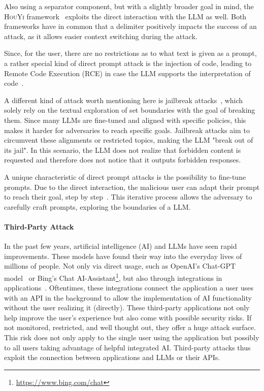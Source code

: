 Also using a separator component, but with a slightly broader goal in mind, the \textsc{HouYi} framework~\cite{liu2023prompt} exploits the direct interaction with the LLM as well.
Both frameworks have in common that a delimiter positively impacts the success of an attack, as it allows easier context switching during the attack. 

Since, for the user, there are no restrictions as to what text is given as a prompt, a rather special kind of direct prompt attack is the injection of code, leading to Remote Code Execution (RCE) in case the LLM supports the interpretation of code~\cite{yu2023assessing, liu2023demystifying}. 

A different kind of attack worth mentioning here is jailbreak attacks~\cite{wei2023jailbroken}, which solely rely on the textual exploration of set boundaries with the goal of breaking them. Since many LLMs are fine-tuned and aligned with specific policies, this makes it harder for adversaries to reach specific goals. Jailbreak attacks aim to circumvent these alignments or restricted topics, making the LLM "break out of its jail". In this scenario, the LLM does not realize that forbidden content is requested and therefore does not notice that it outputs forbidden responses.

A unique characteristic of direct prompt attacks is the possibility to fine-tune prompts. 
Due to the direct interaction, the malicious user can adapt their prompt to reach their goal, step by step~\cite{liu2023prompt, yao2023poisonprompt}.
This iterative process allows the adversary to carefully craft prompts, exploring the boundaries of a LLM.
\paragraph{Third-Party Attack}
In the past few years, artificial intelligence (AI) and LLMs have seen rapid improvements. 
These models have found their way into the everyday lives of millions of people. 
Not only via direct usage, such as OpenAI's Chat-GPT model~\cite{openai2023gpt4} or Bing's Chat AI-Assistant\footnote{\href{https://www.bing.com/chat}{https://www.bing.com/chat}}, but also through integrations in applications~\cite{10.1145/3605764.3623985}. 
Oftentimes, these integrations connect the application a user uses with an API in the background to allow the implementation of AI functionality without the user realizing it (directly). 
These third-party applications not only help improve the user's experience but also come with possible security risks. 
If not monitored, restricted, and well thought out, they offer a huge attack surface. 
This risk does not only apply to the single user using the application but possibly to all users taking advantage of helpful integrated AI.
Third-party attacks thus exploit the connection between applications and LLMs or their APIs. 

